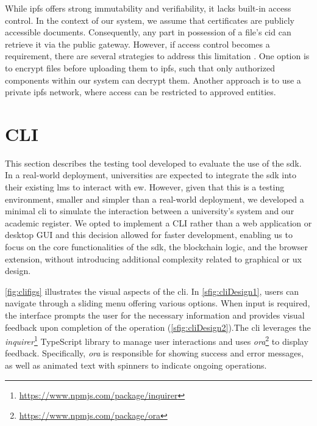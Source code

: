 While \gls{ipfs} offers strong immutability and verifiability, it lacks built-in access control. In the context of our system, we assume that certificates are publicly accessible documents. Consequently, any part in possession of a file's \gls{cid} can retrieve it via the public gateway. However, if access control becomes a requirement, there are several strategies to address this limitation \cite{barbaraanrealaura2021datapersistence}. One option is to encrypt files before uploading them to \gls{ipfs}, such that only authorized components within our system can decrypt them. Another approach is to use a private \gls{ipfs} network, where access can be restricted to approved entities.

\section{CLI}
\label{sec:cliDesign}
This section describes the testing tool developed to evaluate the use of the \gls{sdk}. In a real-world deployment, universities are expected to integrate the \gls{sdk} into their existing \gls{lms} to interact with \gls{ew}. However, given that this is a testing environment, smaller and simpler than a real-world deployment, we developed a minimal \gls{cli} to simulate the interaction between a university's system and our academic register. We opted to implement a CLI rather than a web application or desktop GUI and this decision allowed for faster development, enabling us to focus on the core functionalities of the \gls{sdk}, the blockchain logic, and the browser extension, without introducing additional complexity related to graphical or \gls{ux} design.

\cref{fig:clifigs} illustrates the visual aspects of the \gls{cli}. In \cref{sfig:cliDesign1}, users can navigate through a sliding menu offering various options. When input is required, the interface prompts the user for the necessary information and provides visual feedback upon completion of the operation (\cref{sfig:cliDesign2}).The \gls{cli} leverages the \textit{inquirer}\footnote{\url{https://www.npmjs.com/package/inquirer}} TypeScript library to manage user interactions and uses \textit{ora}\footnote{\url{https://www.npmjs.com/package/ora}} to display feedback. Specifically, \textit{ora} is responsible for showing success and error messages, as well as animated text with spinners to indicate ongoing operations.


